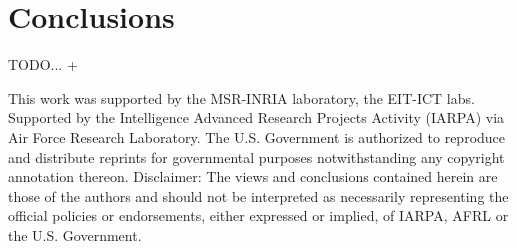 

\section{Conclusions}
TODO...
+


\begin{acknowledgements}
   This work was supported by the MSR-INRIA laboratory, the EIT-ICT labs.
   {
   \small
   \noindent
   Supported by the Intelligence Advanced Research Projects Activity (IARPA) via Air Force Research Laboratory. The U.S. Government is authorized to reproduce and distribute reprints for governmental purposes notwithstanding any copyright annotation thereon. Disclaimer:  The views and conclusions contained herein are those of the authors and should not be interpreted as necessarily representing the official policies or endorsements, either expressed or implied, of IARPA, AFRL or the U.S. Government.
   }
\end{acknowledgements}




%

{\footnotesize

}
%



